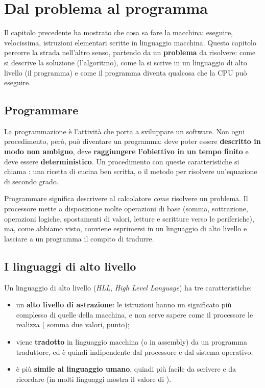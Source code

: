 \chapter{Dal problema al programma}
\label{chap:dal-problema}

Il capitolo precedente ha mostrato che cosa sa fare la macchina: eseguire,
velocissima, istruzioni elementari scritte in linguaggio macchina. Questo
capitolo percorre la strada nell'altro senso, partendo da un
\textbf{problema} da risolvere: come si descrive la soluzione (l'algoritmo),
come la si scrive in un linguaggio di alto livello (il programma) e come il
programma diventa qualcosa che la CPU può eseguire.

\section{Programmare}

La programmazione è l'attività che porta a sviluppare un software. Non ogni
procedimento, però, può diventare un programma: deve poter essere
\textbf{descritto in modo non ambiguo}, deve \textbf{raggiungere l'obiettivo
in un tempo finito} e deve essere \textbf{deterministico}. Un procedimento
con queste caratteristiche si chiama : una ricetta di cucina
ben scritta, o il metodo per risolvere un'equazione di secondo grado.

Programmare significa descrivere al calcolatore \textit{come} risolvere un
problema. Il processore mette a disposizione molte operazioni di base
(somma, sottrazione, operazioni logiche, spostamenti di valori, letture e
scritture verso le periferiche), ma, come abbiamo visto, conviene esprimersi
in un linguaggio di alto livello e lasciare a un programma il compito di
tradurre.

\section{I linguaggi di alto livello}

Un linguaggio di alto livello (\textit{HLL}, \textit{High Level Language})
ha tre caratteristiche:

\begin{itemize}
  \item un \textbf{alto livello di astrazione}: le istruzioni hanno un
        significato più complesso di quelle della macchina, e non serve
        sapere come il processore le realizza ( somma due
        valori, punto);
  \item viene \textbf{tradotto} in linguaggio macchina (o in assembly) da
        un programma traduttore, ed è quindi indipendente dal processore e
        dal sistema operativo;
  \item è più \textbf{simile al linguaggio umano}, quindi più facile da
        scrivere e da ricordare (in molti linguaggi  mostra il
        valore di ).
\end{itemize}

